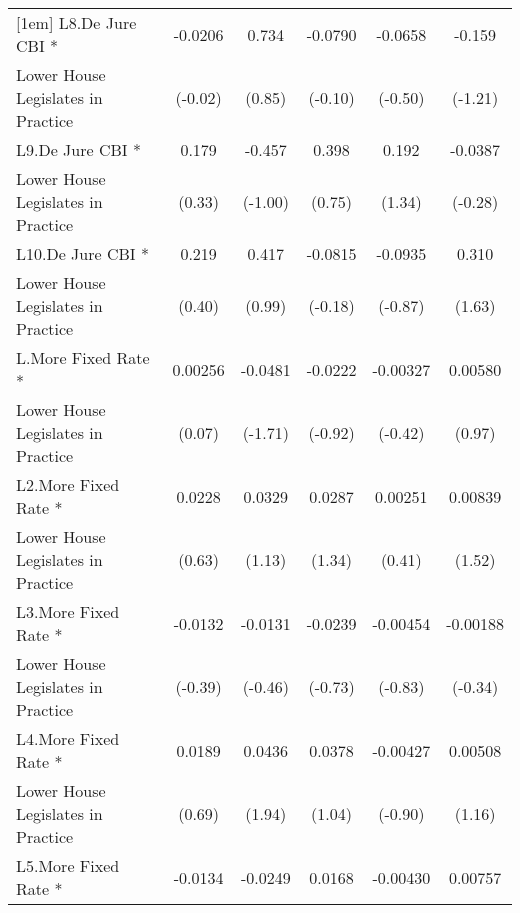 {\begin{tabular}{l*{5}{c}}
[1em]
L8.De Jure CBI *    &     -0.0206         &       0.734         &     -0.0790         &     -0.0658         &      -0.159         \\
Lower House Legislates in Practice&     (-0.02)         &      (0.85)         &     (-0.10)         &     (-0.50)         &     (-1.21)         \\
[1em]
L9.De Jure CBI *    &       0.179         &      -0.457         &       0.398         &       0.192         &     -0.0387         \\
Lower House Legislates in Practice&      (0.33)         &     (-1.00)         &      (0.75)         &      (1.34)         &     (-0.28)         \\
[1em]
L10.De Jure CBI *   &       0.219         &       0.417         &     -0.0815         &     -0.0935         &       0.310         \\
Lower House Legislates in Practice&      (0.40)         &      (0.99)         &     (-0.18)         &     (-0.87)         &      (1.63)         \\
[1em]
L.More Fixed Rate * &     0.00256         &     -0.0481         &     -0.0222         &    -0.00327         &     0.00580         \\
Lower House Legislates in Practice&      (0.07)         &     (-1.71)         &     (-0.92)         &     (-0.42)         &      (0.97)         \\
[1em]
L2.More Fixed Rate *&      0.0228         &      0.0329         &      0.0287         &     0.00251         &     0.00839         \\
Lower House Legislates in Practice&      (0.63)         &      (1.13)         &      (1.34)         &      (0.41)         &      (1.52)         \\
[1em]
L3.More Fixed Rate *&     -0.0132         &     -0.0131         &     -0.0239         &    -0.00454         &    -0.00188         \\
Lower House Legislates in Practice&     (-0.39)         &     (-0.46)         &     (-0.73)         &     (-0.83)         &     (-0.34)         \\
[1em]
L4.More Fixed Rate *&      0.0189         &      0.0436         &      0.0378         &    -0.00427         &     0.00508         \\
Lower House Legislates in Practice&      (0.69)         &      (1.94)         &      (1.04)         &     (-0.90)         &      (1.16)         \\
[1em]
L5.More Fixed Rate *&     -0.0134         &     -0.0249         &      0.0168         &    -0.00430         &     0.00757         \\

\end{tabular}}
